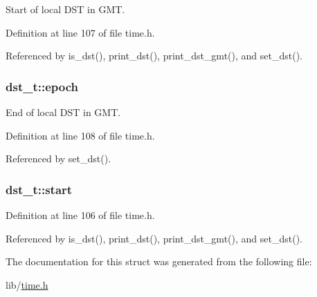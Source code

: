 Start of local D\+ST in G\+MT. 



Definition at line 107 of file time.\+h.



Referenced by is\+\_\+dst(), print\+\_\+dst(), print\+\_\+dst\+\_\+gmt(), and set\+\_\+dst().

\subsubsection[{\texorpdfstring{epoch}{epoch}}]{ dst\+\_\+t\+::epoch}\hypertarget{structdst__t_ae8b931e1a2731b688e1af1253787827c}{}\label{structdst__t_ae8b931e1a2731b688e1af1253787827c}


End of local D\+ST in G\+MT. 



Definition at line 108 of file time.\+h.



Referenced by set\+\_\+dst().

\subsubsection[{\texorpdfstring{start}{start}}]{ dst\+\_\+t\+::start}\hypertarget{structdst__t_af1868fb321db3637664e3a3bf11cf56b}{}\label{structdst__t_af1868fb321db3637664e3a3bf11cf56b}


Definition at line 106 of file time.\+h.



Referenced by is\+\_\+dst(), print\+\_\+dst(), print\+\_\+dst\+\_\+gmt(), and set\+\_\+dst().



The documentation for this struct was generated from the following file\+:\begin{DoxyCompactItemize}
\item 
lib/\hyperlink{time_8h}{time.\+h}\end{DoxyCompactItemize}
